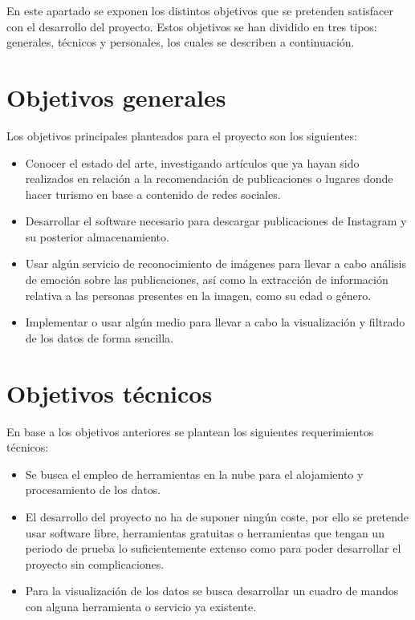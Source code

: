 
En este apartado se exponen los distintos objetivos que se pretenden satisfacer con el desarrollo del proyecto. Estos objetivos se han dividido en tres tipos: generales, técnicos y personales, los cuales se describen a continuación.

\section{Objetivos generales}

Los objetivos principales planteados para el proyecto son los siguientes:

\begin{itemize}
    \item Conocer el estado del arte, investigando artículos que ya hayan sido realizados en relación a la recomendación de publicaciones o lugares donde hacer turismo en base a contenido de redes sociales.
    \item Desarrollar el software necesario para descargar publicaciones de Instagram y su posterior almacenamiento.
    \item Usar algún servicio de reconocimiento de imágenes para llevar a cabo análisis de emoción sobre las publicaciones, así como la extracción de información relativa a las personas presentes en la imagen, como su edad o género.
    \item Implementar o usar algún medio para llevar a cabo la visualización y filtrado de los datos de forma sencilla.
\end{itemize}

\section{Objetivos técnicos}

En base a los objetivos anteriores se plantean los siguientes requerimientos técnicos:

\begin{itemize}
    \item Se busca el empleo de herramientas en la nube para el alojamiento y procesamiento de los datos.
    \item El desarrollo del proyecto no ha de suponer ningún coste, por ello se pretende usar software libre, herramientas gratuitas o herramientas que tengan un periodo de prueba lo suficientemente extenso como para poder desarrollar el proyecto sin complicaciones.
    \item Para la visualización de los datos se busca desarrollar un cuadro de mandos con alguna herramienta o servicio ya existente.
\end{itemize}

